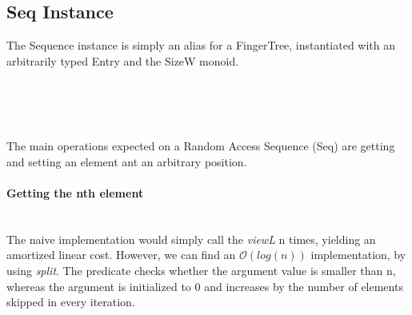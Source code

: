\documentclass[12pt,twoside,notitlepage]{report}
\begin{document}
\subsection{Seq Instance}

The Sequence instance is simply an alias for a FingerTree, instantiated with an arbitrarily typed Entry and the SizeW monoid.

\begin{code}
\\
\>[0]\<[4]%
\>[4] \AgdaSymbol{:}  \AgdaSymbol{\{}\AgdaSymbol{\}(} \AgdaSymbol{:}  \AgdaSymbol{)}    \<%
\\
\>[0]\<[4]%
\>[4] \AgdaSymbol{\{}\AgdaSymbol{\}}   \AgdaSymbol{=}  \AgdaSymbol{(} \AgdaSymbol{)} \AgdaSymbol{(} \AgdaSymbol{\{}\AgdaSymbol{\})} \AgdaSymbol{\{}\AgdaSymbol{\}}\<%
\\
\end{code}

The main operations expected on a Random Access Sequence (Seq) are getting and setting an element ant an arbitrary position.

\paragraph{Getting the nth element} \mbox{} \\ 
The naive implementation would simply call the \textit{viewL} n times, yielding an amortized linear cost. However, we can find an $\mathcal{O}(log(n))$ implementation, by using \textit{split}. The predicate checks whether the argument value is smaller than n, whereas the argument is initialized to 0 and increases by the number of elements skipped in every iteration.
\end{document}
